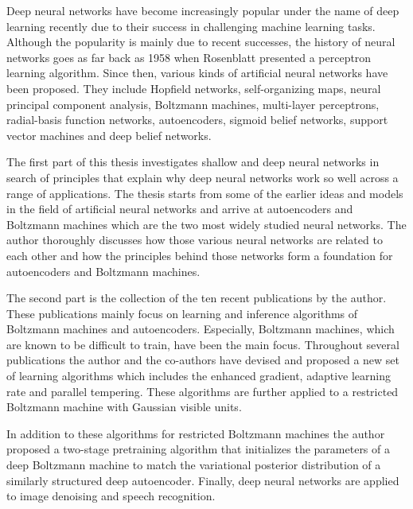 Deep neural networks have become increasingly popular
under the name of deep learning recently due to their
success in challenging machine learning tasks.  Although the
popularity is mainly due to recent successes, the
history of neural networks goes as far back as 1958 when
Rosenblatt presented a perceptron learning algorithm.  Since
then, various kinds of artificial neural networks have been
proposed. They include Hopfield networks, self-organizing
maps, neural principal component analysis, Boltzmann
machines, multi-layer perceptrons, radial-basis function
networks, autoencoders, sigmoid belief networks, support
vector machines and deep belief networks.

The first part of this thesis investigates shallow and deep
neural networks in search of principles that explain why deep
neural networks work so well across a range of applications.
The thesis starts from
some of the earlier ideas and models in the field of
artificial neural networks and arrive at autoencoders and
Boltzmann machines which are the two most widely studied neural
networks. The author thoroughly discusses how
those various neural networks are related to each other and
how the principles behind those networks form a foundation for
autoencoders and Boltzmann machines. 

The second part is the collection of the ten recent
publications by the author. These publications mainly focus
on learning and inference algorithms of Boltzmann machines
and autoencoders. Especially, Boltzmann machines, which are
known to be difficult to train, have been the main focus.
Throughout several publications the author and the
co-authors have devised and proposed a new set of learning
algorithms which includes the enhanced gradient, adaptive
learning rate and parallel tempering. These algorithms are
further applied to a restricted Boltzmann machine with
Gaussian visible units.

In addition to these algorithms for restricted Boltzmann
machines the author proposed a two-stage pretraining
algorithm that initializes the parameters of a deep
Boltzmann machine to match the variational posterior
distribution of a similarly structured deep autoencoder.
Finally, deep neural networks are applied to image denoising
and speech recognition.






